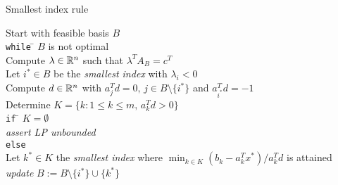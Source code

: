 \begin{frame}{}

  \begin{columns}
    \begin{column}{.5\textwidth}
      
    \end{column}
    \begin{column}{.5\textwidth}
      
    \end{column}       
  \end{columns}
\end{frame}


\begin{frame}{Smallest index rule}

 \begin{tabbing}
      Start with feasible basis $B$ \\[1ex]
      {\tt while} \= $B$ is not optimal \\ [.7ex]
      \> Compute $\lambda \in \mathbb{R}^n$ such that $\lambda^TA_B = c^T$ \\
      \> Let $i^* \in B$ be the \emph{ smallest index} with $\lambda_i<0$ \\
      \> Compute  $d \in \mathbb{R}^n$ with $a_j^T d = 0, \, j \in B \setminus\{i^*\}$
      and $a_{i^*}^T d = -1$ \\ 
      \> Determine $K = \{ k \colon 1 \leq k \leq m, \, a_k^Td >0\}$\\[.7ex]  
      \> {\tt if} \= $K = \emptyset$ \\   
      \> \> \emph{assert LP unbounded} \\
      \> {\tt else} \\
      \> \> Let $k^* \in K$ the \emph{smallest index} where 
     $
        \displaystyle \min_{k \in K} (b_k - a_k^Tx^*)/a_k^Td
      $
      is attained \\ %

      \> \>\emph{update} $B := B \setminus\{i^*\} \cup \{k^*\}$             
    \end{tabbing}
    

  
  \begin{columns}
    \begin{column}{.5\textwidth}
      
    \end{column}
    \begin{column}{.5\textwidth}
      
    \end{column}       
  \end{columns}
\end{frame}




